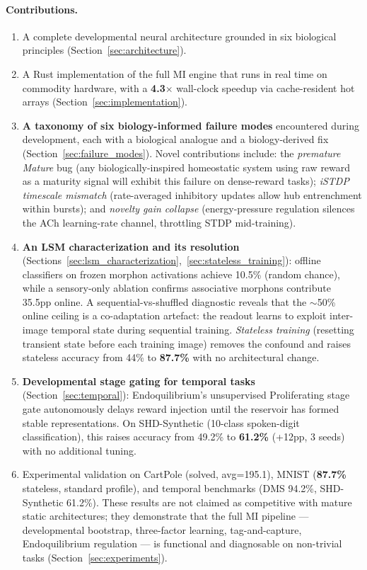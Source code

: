 \paragraph{Contributions.}
\begin{enumerate}
  \item A complete developmental neural architecture grounded in six biological principles (Section~\ref{sec:architecture}).
  \item A Rust implementation of the full MI engine that runs in real time on commodity hardware, with a \textbf{4.3$\times$} wall-clock speedup via cache-resident hot arrays (Section~\ref{sec:implementation}).
  \item \textbf{A taxonomy of six biology-informed failure modes} encountered during development, each with a biological analogue and a biology-derived fix (Section~\ref{sec:failure_modes}). Novel contributions include: the \emph{premature Mature} bug (any biologically-inspired homeostatic system using raw reward as a maturity signal will exhibit this failure on dense-reward tasks); \emph{iSTDP timescale mismatch} (rate-averaged inhibitory updates allow hub entrenchment within bursts); and \emph{novelty gain collapse} (energy-pressure regulation silences the ACh learning-rate channel, throttling STDP mid-training).
  \item \textbf{An LSM characterization and its resolution} (Sections~\ref{sec:lsm_characterization},~\ref{sec:stateless_training}): offline classifiers on frozen morphon activations achieve 10.5\% (random chance), while a sensory-only ablation confirms associative morphons contribute 35.5pp online. A sequential-vs-shuffled diagnostic reveals that the $\sim$50\% online ceiling is a co-adaptation artefact: the readout learns to exploit inter-image temporal state during sequential training. \emph{Stateless training} (resetting transient state before each training image) removes the confound and raises stateless accuracy from 44\% to \textbf{87.7\%} with no architectural change.
  \item \textbf{Developmental stage gating for temporal tasks} (Section~\ref{sec:temporal}): Endoquilibrium's unsupervised Proliferating stage gate autonomously delays reward injection until the reservoir has formed stable representations. On SHD-Synthetic (10-class spoken-digit classification), this raises accuracy from 49.2\% to \textbf{61.2\%} (+12pp, 3 seeds) with no additional tuning.
  \item Experimental validation on CartPole (solved, avg=195.1), MNIST (\textbf{87.7\%} stateless, standard profile), and temporal benchmarks (DMS 94.2\%, SHD-Synthetic 61.2\%). These results are not claimed as competitive with mature static architectures; they demonstrate that the full MI pipeline --- developmental bootstrap, three-factor learning, tag-and-capture, Endoquilibrium regulation --- is functional and diagnosable on non-trivial tasks (Section~\ref{sec:experiments}).
\end{enumerate}

